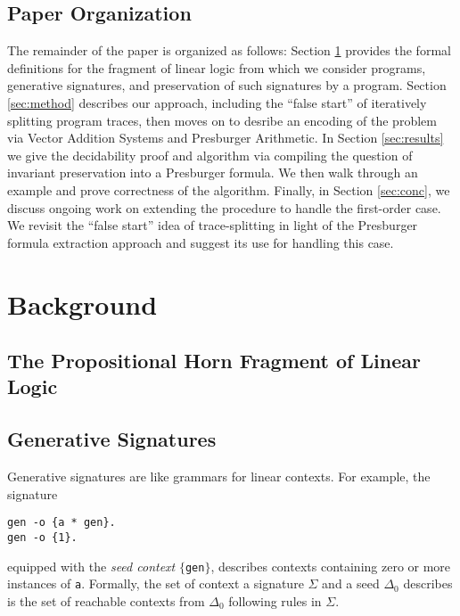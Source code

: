 \documentclass[fullpage, 11pt]{article}
\begin{document}
\subsection{Paper Organization}

The remainder of the paper is organized as follows: Section
\ref{sec:background} provides the formal definitions for the fragment of
linear logic from which we consider programs, generative signatures, and
preservation of such signatures by a program. Section \ref{sec:method}
describes our approach, including the ``false start'' of iteratively
splitting program traces, then moves on to
desribe an encoding of the problem via Vector Addition Systems and
Presburger Arithmetic. In Section \ref{sec:results} we give the decidability
proof and algorithm via compiling the question of invariant preservation
into a Presburger formula. We then walk through an example and prove
correctness of the algorithm. Finally, in Section \ref{sec:conc}, we
discuss ongoing work on extending the procedure to handle the first-order
case. We revisit the ``false start'' idea of trace-splitting in light of
the Presburger formula extraction approach and suggest its use for handling
this case.

\section{Background}
\label{sec:background}

\subsection{The Propositional Horn Fragment of Linear Logic}

\subsection{Generative Signatures}

Generative signatures are like grammars for linear contexts. For example,
the signature 

\begin{verbatim}
gen -o {a * gen}.
gen -o {1}.
\end{verbatim}

equipped with the {\em seed context} $\{$\verb|gen|$\}$, describes contexts
containing zero or more instances of \verb|a|. Formally, the set of context
a signature $\Sigma$ and a seed $\Delta_0$ describes is the set of
reachable contexts from $\Delta_0$ following rules in $\Sigma$.
\end{document}
